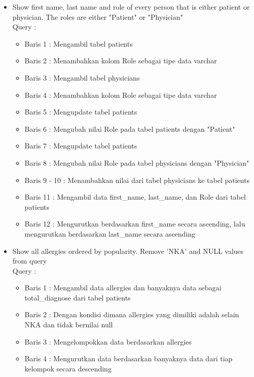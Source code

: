 \documentclass[]{article}
\begin{document}
\begin{itemize}
        \item Show first name, last name and role of every person that is either patient or physician. The roles are either "Patient" or "Physician"
        \\Query :
        
        \begin{itemize}
            \item Baris 1 : Mengambil tabel patients
            \item Baris 2 : Menambahkan kolom Role sebagai tipe data varchar
            \item Baris 3 : Mengambil tabel physicians
            \item Baris 4 : Menambahkan kolom Role sebagai tipe data varchar
            \item Baris 5 : Mengupdate tabel patients
            \item Baris 6 : Mengubah nilai Role pada tabel patients dengan "Patient"
            \item Baris 7 : Mengupdate tabel patients
            \item Baris 8 : Mengubah nilai Role pada tabel physicians dengan "Physician"
            \item Baris 9 - 10 : Menambahkan nilai dari tabel physicians ke tabel patients
            \item Baris 11 : Mengambil data first\_name, last\_name, dan Role dari tabel patients
            \item Baris 12 : Mengurutkan berdasarkan first\_name secara ascending, lalu mengurutkan berdasarkan last\_name secara ascending
        \end{itemize}

        \item Show all allergies ordered by popularity. Remove 'NKA' and NULL values from query
        \\Query :
        
        \begin{itemize}
            \item Baris 1 : Mengambil data allergies dan banyaknya data sebagai total\_diagnose dari tabel patients
            \item Baris 2 : Dengan kondisi dimana allergies yang dimiliki adalah selain NKA dan tidak bernilai null
            \item Baris 3 : Mengelompokkan data berdasarkan allergies
            \item Baris 4 : Mengurutkan data berdasarkan banyaknya data dari tiap kelompok secara descending
        \end{itemize}

    \end{itemize}
    \pagebreak
\end{document}
